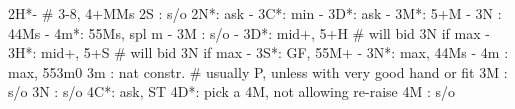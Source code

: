2H*- # 3-8, 4+MMs
2S : s/o
2N*: ask
   - 3C*: min
        - 3D*: ask
             - 3M*: 5+M
             - 3N : 44Ms
             - 4m*: 55Ms, spl m
        - 3M : s/o
   - 3D*: mid+, 5+H  # will bid 3N if max
   - 3H*: mid+, 5+S  # will bid 3N if max
   - 3S*: GF, 55M+
   - 3N*: max, 44Ms
   - 4m : max, 553m0
3m : nat constr.  # usually P, unless with very good hand or fit
3M : s/o
3N : s/o
4C*: ask, ST
4D*: pick a 4M, not allowing re-raise
4M : s/o
